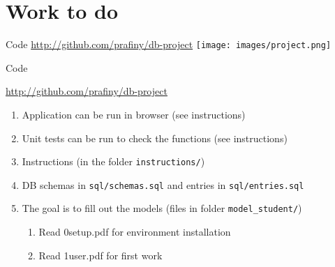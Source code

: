 \documentclass{beamer}
\begin{document}
\section{Work to do}

\begin{frame}{Code}
\center
\url{http://github.com/prafiny/db-project}
\texttt{[image: images/project.png]}  
\end{frame}

\begin{frame}{Code}
    \begin{center}
        \url{http://github.com/prafiny/db-project}
    \end{center}

\begin{enumerate}

\item Application can be run in browser (see instructions)
\item Unit tests can be run to check the functions (see instructions)
\item Instructions (in the folder \texttt{instructions/})
\item DB schemas in \texttt{sql/schemas.sql} and entries in \texttt{sql/entries.sql}
\item The goal is to fill out the models (files in folder \texttt{model\_student/})
\begin{enumerate}
\item Read 0setup.pdf for environment installation
\item Read 1user.pdf for first work
\end{enumerate}
\end{enumerate}

\end{frame}
\end{document}
